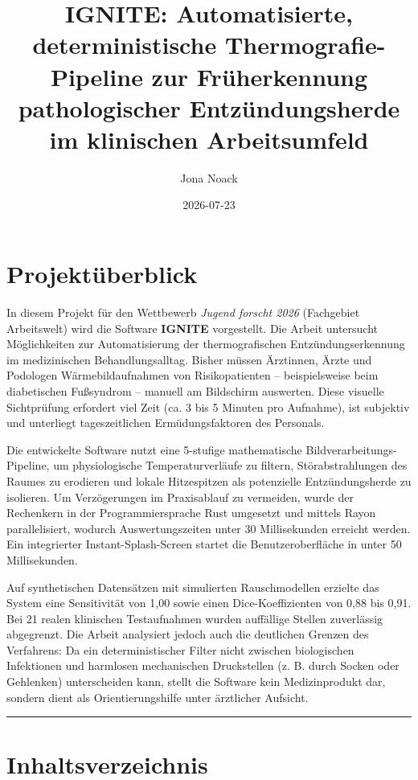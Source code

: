 \documentclass[
  11pt,
]{article}
\title{IGNITE: Automatisierte, deterministische Thermografie-Pipeline
zur Früherkennung pathologischer Entzündungsherde im klinischen
Arbeitsumfeld}
\author{Jona Noack}
\date{2026-07-23}
\begin{document}
\maketitle

\section{Projektüberblick}\label{projektuxfcberblick}

In diesem Projekt für den Wettbewerb \emph{Jugend forscht 2026}
(Fachgebiet Arbeitswelt) wird die Software \textbf{IGNITE} vorgestellt.
Die Arbeit untersucht Möglichkeiten zur Automatisierung der
thermografischen Entzündungserkennung im medizinischen
Behandlungsalltag. Bisher müssen Ärztinnen, Ärzte und Podologen
Wärmebildaufnahmen von Risikopatienten -- beispielsweise beim
diabetischen Fußsyndrom -- manuell am Bildschirm auswerten. Diese
visuelle Sichtprüfung erfordert viel Zeit (ca. 3 bis 5 Minuten pro
Aufnahme), ist subjektiv und unterliegt tageszeitlichen
Ermüdungsfaktoren des Personals.

Die entwickelte Software nutzt eine 5-stufige mathematische
Bildverarbeitungs-Pipeline, um physiologische Temperaturverläufe zu
filtern, Störabstrahlungen des Raumes zu erodieren und lokale
Hitzespitzen als potenzielle Entzündungsherde zu isolieren. Um
Verzögerungen im Praxisablauf zu vermeiden, wurde der Rechenkern in der
Programmiersprache Rust umgesetzt und mittels Rayon parallelisiert,
wodurch Auswertungszeiten unter 30 Millisekunden erreicht werden. Ein
integrierter Instant-Splash-Screen startet die Benutzeroberfläche in
unter 50 Millisekunden.

Auf synthetischen Datensätzen mit simulierten Rauschmodellen erzielte
das System eine Sensitivität von 1,00 sowie einen Dice-Koeffizienten von
0,88 bis 0,91. Bei 21 realen klinischen Testaufnahmen wurden auffällige
Stellen zuverlässig abgegrenzt. Die Arbeit analysiert jedoch auch die
deutlichen Grenzen des Verfahrens: Da ein deterministischer Filter nicht
zwischen biologischen Infektionen und harmlosen mechanischen
Druckstellen (z. B. durch Socken oder Gehlenken) unterscheiden kann,
stellt die Software kein Medizinprodukt dar, sondern dient als
Orientierungshilfe unter ärztlicher Aufsicht.

\begin{center}\rule{0.5\linewidth}{0.5pt}\end{center}

\section{Inhaltsverzeichnis}\label{inhaltsverzeichnis}
\end{document}
